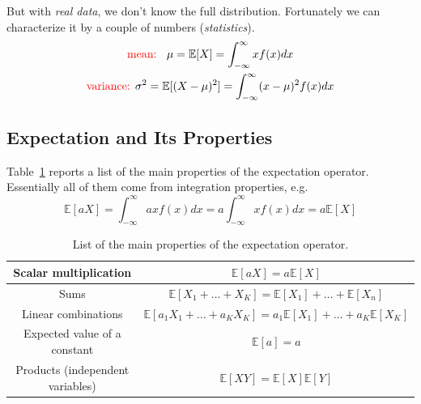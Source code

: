 \documentclass[12pt,a4paper]{book}
\begin{document}
But with \textit{real data}, we don't know the full distribution. Fortunately we can characterize it by a couple of numbers (\emph{statistics}).
\begin{equation}
\begin{gathered}
\text{\textcolor{red}{mean: }
} \mu = \mathbb{E}[X] = \int_{-\infty}^{\infty} xf(x)dx \\
\text{\textcolor{red}{variance: }}  
\sigma^2 = \mathbb{E}[(X-\mu)^2] =\int_{-\infty}^{\infty} (x-\mu)^2f(x)dx
\end{gathered}
\end{equation}

\subsection{Expectation and Its Properties}
Table~\ref{tab:expectation_prop} reports a list of the main properties of the expectation operator.
Essentially all of them come from integration properties, e.g.
\begin{equation*}
	\mathbb{E}[aX] = \int_{-\infty}^{\infty} ax f(x) dx = a  \int_{-\infty}^{\infty} x f(x) dx = a\mathbb{E}[X]
\end{equation*}

\renewcommand{\arraystretch}{1.4}
\begin{table}[hbt]
	\begin{center}
		\begin{tabular}{|c|c|} \hline
			Scalar multiplication & $\mathbb{E}[aX] = a\mathbb{E}[X]$ \\ \hline
			Sums & $\mathbb{E}[X_1+\ldots +X_K] =  \mathbb{E}[X_1] +\ldots + \mathbb{E}[X_n]$ \\ \hline
			Linear combinations & $\mathbb{E}[a_1X_1+\ldots +a_KX_K] =  a_1\mathbb{E}[X_1] +\ldots + a_K\mathbb{E}[X_K]$ \\ \hline
			Expected value of a constant & $\mathbb{E}[a] = a$ \\ \hline
			Products (independent variables) & $\mathbb{E}[XY] = \mathbb{E}[X] \mathbb{E}[Y]$ \\ \hline
		\end{tabular}
	\end{center}
\label{tab:expectation_prop}
\caption{List of the main properties of the expectation operator.}
\end{table}
\end{document}
